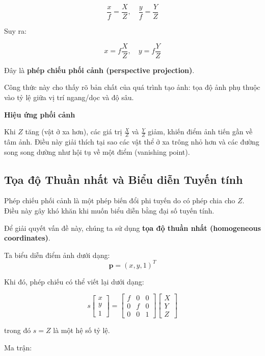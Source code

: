 \[
\frac{x}{f} = \frac{X}{Z}, \quad \frac{y}{f} = \frac{Y}{Z}
\]

Suy ra:

\[
x = f \frac{X}{Z}, \quad y = f \frac{Y}{Z}
\]

Đây là \textbf{phép chiếu phối cảnh (perspective projection)}.

Công thức này cho thấy rõ bản chất của quá trình tạo ảnh: tọa độ ảnh phụ thuộc vào tỷ lệ giữa vị trí ngang/dọc và độ sâu.

\begin{mdframed}[style=infobox]
	\textbf{Hiệu ứng phối cảnh}
	
	Khi $Z$ tăng (vật ở xa hơn), các giá trị $\frac{X}{Z}$ và $\frac{Y}{Z}$ giảm, khiến điểm ảnh tiến gần về tâm ảnh. Điều này giải thích tại sao các vật thể ở xa trông nhỏ hơn và các đường song song dường như hội tụ về một điểm (vanishing point).
\end{mdframed}

\subsection{Tọa độ Thuần nhất và Biểu diễn Tuyến tính}
\label{subsec:homogeneous_coordinates_pinhole}

Phép chiếu phối cảnh là một phép biến đổi phi tuyến do có phép chia cho $Z$. Điều này gây khó khăn khi muốn biểu diễn bằng đại số tuyến tính.

Để giải quyết vấn đề này, chúng ta sử dụng \textbf{tọa độ thuần nhất (homogeneous coordinates)}.

Ta biểu diễn điểm ảnh dưới dạng:
\[
\mathbf{p} = (x, y, 1)^T
\]

Khi đó, phép chiếu có thể viết lại dưới dạng:

\[
s
\begin{bmatrix}
	x \\ y \\ 1
\end{bmatrix}
=
\begin{bmatrix}
	f & 0 & 0 \\
	0 & f & 0 \\
	0 & 0 & 1
\end{bmatrix}
\begin{bmatrix}
	X \\ Y \\ Z
\end{bmatrix}
\]

trong đó $s = Z$ là một hệ số tỷ lệ.

Ma trận:


